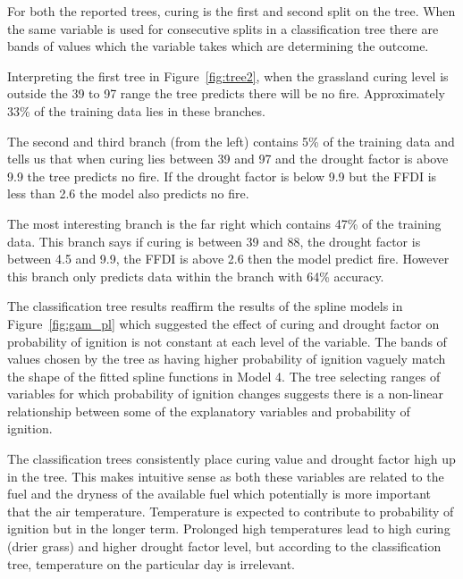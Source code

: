 \documentclass[11pt,a4paper]{article}
\begin{document}
For both the reported trees, curing is the first and second split on the tree. When the same variable is used for consecutive splits in a classification tree there are bands of values which the variable takes which are determining the outcome.

Interpreting the first tree in Figure~\ref{fig:tree2}, when the grassland curing level is outside the 39 to 97 range the tree predicts there will be no fire. Approximately 33\% of the training data lies in these branches.

The second and third branch (from the left) contains 5\% of the training data and tells us that when curing lies between 39 and 97 and the drought factor is above 9.9 the tree predicts no fire. If the drought factor is below 9.9 but the FFDI is less than 2.6 the model also predicts no fire.

The most interesting branch is the far right which contains 47\% of the training data. This branch says if curing is between 39 and 88, the drought factor is between 4.5 and 9.9, the FFDI is above 2.6 then the model predict fire. However this branch only predicts data within the branch with 64\% accuracy.

The classification tree results reaffirm the results of the spline models in Figure~\ref{fig:gam_pl} which suggested the effect of curing and drought factor on probability of ignition is not constant at each level of the variable. The bands of values chosen by the tree as having higher probability of ignition vaguely match the shape of the fitted spline functions in Model 4. The tree selecting ranges of variables for which probability of ignition changes suggests there is a  non-linear relationship between some of the explanatory variables and probability of ignition.


The classification trees consistently place  curing value and drought factor high up in the tree. This makes intuitive sense as both these variables are related to the fuel and the dryness of the available fuel which potentially is more important that the air temperature. Temperature is expected to contribute to probability of ignition but in the longer term. Prolonged high temperatures lead to high curing (drier grass) and higher drought factor level, but according to the classification tree, temperature on the particular day is irrelevant.
\end{document}
